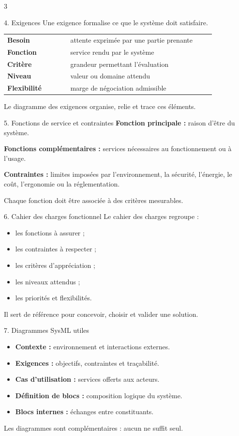 \documentclass[a3paper,landscape,10pt]{article}
\begin{document}
\begin{multicols}{3}
\begin{TLPosterBloc}{4. Exigences}
Une exigence formalise ce que le système doit satisfaire.
\begin{center}
\begin{tabular}{>{\bfseries}p{0.27\linewidth}p{0.62\linewidth}}
Besoin & attente exprimée par une partie prenante \\
Fonction & service rendu par le système \\
Critère & grandeur permettant l'évaluation \\
Niveau & valeur ou domaine attendu \\
Flexibilité & marge de négociation admissible \\
\end{tabular}
\end{center}
Le diagramme des exigences organise, relie et trace ces éléments.
\end{TLPosterBloc}

\begin{TLPosterBloc}{5. Fonctions de service et contraintes}
\textbf{Fonction principale :} raison d'être du système.

\textbf{Fonctions complémentaires :} services nécessaires au fonctionnement ou à l'usage.

\textbf{Contraintes :} limites imposées par l'environnement, la sécurité, l'énergie, le coût, l'ergonomie ou la réglementation.

Chaque fonction doit être associée à des critères mesurables.
\end{TLPosterBloc}

\begin{TLPosterBloc}{6. Cahier des charges fonctionnel}
Le cahier des charges regroupe :
\begin{itemize}
  \item les fonctions à assurer ;
  \item les contraintes à respecter ;
  \item les critères d'appréciation ;
  \item les niveaux attendus ;
  \item les priorités et flexibilités.
\end{itemize}
Il sert de référence pour concevoir, choisir et valider une solution.
\end{TLPosterBloc}

\begin{TLPosterBloc}{7. Diagrammes SysML utiles}
\begin{itemize}
  \item \textbf{Contexte :} environnement et interactions externes.
  \item \textbf{Exigences :} objectifs, contraintes et traçabilité.
  \item \textbf{Cas d'utilisation :} services offerts aux acteurs.
  \item \textbf{Définition de blocs :} composition logique du système.
  \item \textbf{Blocs internes :} échanges entre constituants.
\end{itemize}
Les diagrammes sont complémentaires : aucun ne suffit seul.
\end{TLPosterBloc}


\end{multicols}
\end{document}
